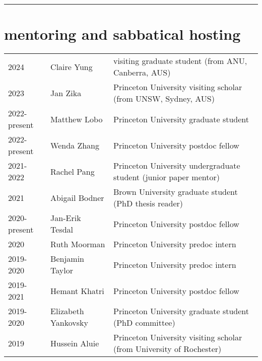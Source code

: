 \documentclass{article}
\begin{document}
\noindent\rule{\textwidth}{1pt}
\vspace{-1cm}
\section*{\sc  \color{Maroon} mentoring and sabbatical hosting}
\vspace{-.25cm}

\begin{tabular}{lll}

2024 & Claire Yung & visiting graduate student (from ANU, Canberra, AUS) \\

2023 & Jan Zika & Princeton University visiting scholar (from UNSW, Sydney, AUS) \\

2022-present & Matthew Lobo& Princeton University graduate student \\

2022-present & Wenda Zhang& Princeton University postdoc fellow \\

2021-2022 & Rachel Pang& Princeton University undergraduate student (junior paper mentor) \\ 


2021 & Abigail Bodner& Brown University graduate student (PhD thesis reader) \\ 


2020-present & Jan-Erik Tesdal& Princeton University postdoc fellow \\ 
2020 & Ruth Moorman & Princeton University predoc intern \\ 

2019-2020 & Benjamin Taylor & Princeton University predoc intern \\ 

2019-2021 & Hemant Khatri & Princeton University postdoc fellow  \\ 

2019-2020 & Elizabeth Yankovsky & Princeton University graduate student (PhD committee) \\ 

2019     & Hussein Aluie & Princeton University visiting scholar (from University of Rochester)  \\ 


\end{tabular}
\end{document}
